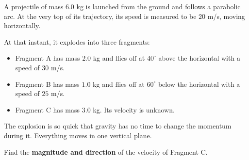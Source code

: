 \begin{Exercise}[title={Three-Fragment Projectile Explosion}, label=three_fragment_projectile]

A projectile of mass $6.0$ kg is launched from the ground and follows a
parabolic arc. At the very top of its trajectory, its speed is measured
to be $20$ m/s, moving horizontally.

At that instant, it explodes into three fragments:

\begin{itemize}
    \item Fragment A has mass $2.0$ kg and flies off at $40^\circ$ above the horizontal with a speed of $30$ m/s.
    \item Fragment B has mass $1.0$ kg and flies off at $60^\circ$ below the horizontal with a speed of $25$ m/s.
    \item Fragment C has mass $3.0$ kg. Its velocity is unknown.
\end{itemize}

The explosion is so quick that gravity has no time to change the momentum
during it. Everything moves in one vertical plane.

Find the \textbf{magnitude and direction} of the velocity of Fragment C.

\end{Exercise}


